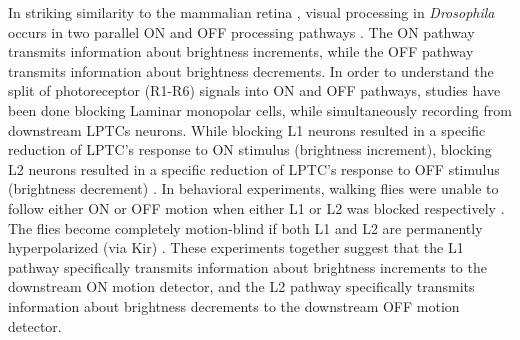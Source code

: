 In striking similarity to the mammalian retina \parencite{Masland2012}, visual processing in \textit{Drosophila} occurs in two parallel ON and OFF processing pathways \parencite{Borst2015}. The ON pathway transmits information about brightness increments, while the OFF pathway transmits information about brightness decrements. In order to understand the split of photoreceptor (R1-R6) signals into ON and OFF pathways, studies have been done blocking Laminar monopolar cells, while simultaneously recording from downstream LPTCs neurons. While blocking L1 neurons resulted in a specific reduction of LPTC's response to ON stimulus (brightness increment), blocking L2 neurons resulted in a specific reduction of LPTC's response to OFF stimulus (brightness decrement) \parencite{Joesch2010}. In behavioral experiments, walking flies were unable to follow either ON or OFF motion when either L1 or L2 was blocked respectively \parencite{Clark2011}. The flies become completely motion-blind if both L1 and L2 are permanently hyperpolarized (via Kir) \parencite{Tuthill2013, Bahl2013}. These experiments together suggest that the L1 pathway specifically transmits information about brightness increments to the downstream ON motion detector, and the L2 pathway specifically transmits information about brightness decrements to the downstream OFF motion detector. 


